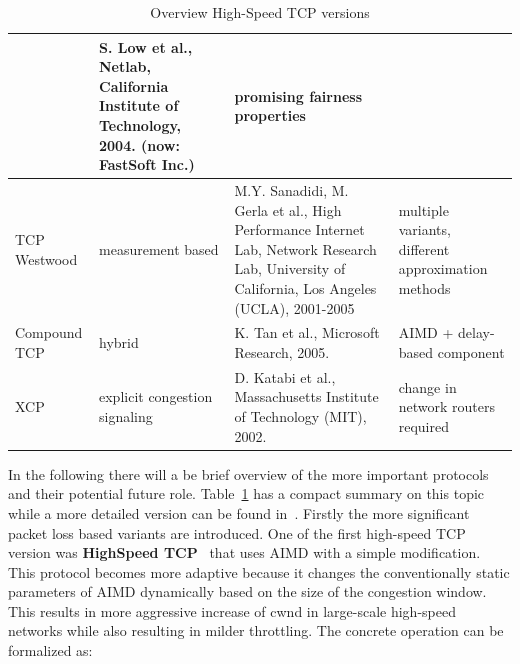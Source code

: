 \documentclass[a4paper]{article}
\begin{document}
\begin{table}
\begin{tabular}{|p{}|p{}|p{}|p{}|}
                                                                                      & S. Low et al., Netlab,
        California Institute of Technology, 2004. (now:
        FastSoft Inc.)                                                                & promising fairness properties
        \\\hline
        \cellcolor{blue!25}TCP Westwood                                               & measurement based
                                                                                      & M.Y. Sanadidi, M. Gerla et al.,
        High Performance Internet Lab,
        Network Research Lab, University of California, Los Angeles (UCLA), 2001-2005 & multiple variants, different
        approximation methods
        \\\hline
        \cellcolor{blue!25}Compound TCP                                               & hybrid
                                                                                      & K. Tan et al., Microsoft
        Research, 2005.                                                               & AIMD + delay-based
        component
        \\\hline
        \cellcolor{blue!25}XCP                                                        & explicit congestion signaling
                                                                                      & D. Katabi et al., Massachusetts
        Institute of Technology (MIT),
        2002.                                                                         & change in network routers
        required
        \\\hline
    \end{tabular}
    \caption{Overview High-Speed TCP versions}
    \label{table:tcpver}
\end{table}

In the following there will a be brief overview of the more important protocols and their potential future role.
Table~\ref{table:tcpver} has a compact summary on this topic while a more detailed version can be found
in~\cite{TCPFairnessAnalysis}. Firstly the more significant packet loss based variants are introduced. One of the first
high-speed TCP version was \textbf{HighSpeed TCP}~\cite{HighSpeedTCP} that uses AIMD with a simple modification. This
protocol becomes more adaptive because it changes the conventionally static parameters of AIMD dynamically based on the
size of the congestion window. This results in more aggressive increase of cwnd in large-scale high-speed networks
while also resulting in milder throttling. The concrete operation can be formalized as:
\end{document}
